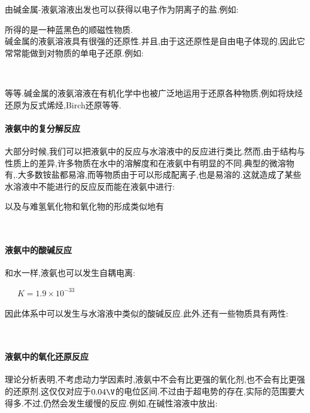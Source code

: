\documentclass{ctexart}
\begin{document}
\indent 由碱金属-液氨溶液出发也可以获得以电子作为阴离子的盐.例如:
\begin{center}
\end{center}
所得的是一种蓝黑色的顺磁性物质.\\
\indent 碱金属的液氨溶液具有很强的还原性.并且,由于这还原性是自由电子体现的,因此它常常能做到对物质的单电子还原.例如:
\begin{center}
    \\
\end{center}
等等.碱金属的液氨溶液在有机化学中也被广泛地运用于还原各种物质,例如将炔烃还原为反式烯烃,Birch还原等等.
\paragraph{液氨中的复分解反应}
大部分时候,我们可以把液氨中的反应与水溶液中的反应进行类比.然而,由于结构与性质上的差异,许多物质在水中的溶解度和在液氨中有明显的不同.典型的微溶物有,.大多数铵盐都易溶,而等物质由于可以形成配离子,也是易溶的.这就造成了某些水溶液中不能进行的反应反而能在液氨中进行:
\begin{center}
\end{center}
以及与难氢氧化物和氧化物的形成类似地有
\begin{center}
    \\
\end{center}
\paragraph{液氨中的酸碱反应}
和水一样,液氨也可以发生自耦电离:
\begin{center}
    \ \ \ $K=1.9\times10^{-33}$
\end{center}
因此体系中可以发生与水溶液中类似的酸碱反应.此外,还有一些物质具有两性:
\begin{center}
    \\
\end{center}
\paragraph{液氨中的氧化还原反应}
理论分析表明,不考虑动力学因素时,液氨中不会有比更强的氧化剂,也不会有比更强的还原剂.这仅仅对应于$0.04\V$的电位区间.不过由于超电势的存在,实际的范围要大得多.不过,仍然会发生缓慢的反应.例如,在碱性溶液中放出:
\begin{center}
\end{center}
\end{document}
